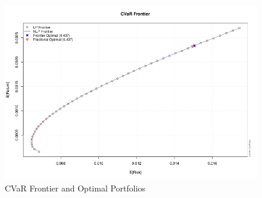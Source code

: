 \begin{landscape}
\begin{figure}[!ht]
\centering
\includegraphics[scale=0.7,width=22cm]{frontier.png}
\caption[CVaR Frontier and Optimal Portfolios]{CVaR Frontier and Optimal Portfolios}\label{fig:frontier}
\end{figure}
\end{landscape} 